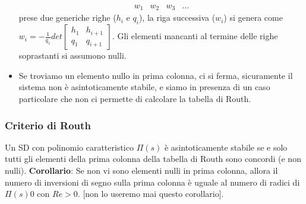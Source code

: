 \begin{itemize}
\[\begin{matrix}
            w_1 & w_2 & w_3 & \dots
        \end{matrix}
    \]
    prese due generiche righe ($h_i$ e $q_i$), la riga successiva ($w_i$) si genera come $w_i = - \frac{1}{q_1} det\left[\begin{matrix}
        h_1 & h_{i+1} \\
        q_1 & q_{i+1}
    \end{matrix}\right]$.\newline
    Gli elementi mancanti al termine delle righe soprastanti si assumono nulli.
    \item Se troviamo un elemento nullo in prima colonna, ci si ferma, sicuramente il sistema non è asintoticamente stabile, e siamo in presenza di un caso particolare che non ci permette di calcolare la tabella di Routh.
\end{itemize}
\subsubsection*{Criterio di Routh}
Un SD con polinomio caratteristico $\Pi(s)$ è asintoticamente stabile se e solo tutti gli elementi della prima colonna della tabella di Routh sono concordi (e non nulli).\newline
\newline
\textbf{Corollario}: Se non vi sono elementi nulli in prima colonna, allora il numero di inversioni di segno sulla prima colonna è uguale al numero di radici di $\Pi(s)0$ con $Re>0$. [non lo useremo mai questo corollario].
